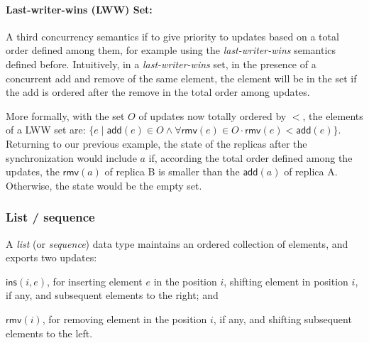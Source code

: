 \documentclass[12pt]{article}
\def\land{\mathrel{\wedge}}
\begin{document}
\paragraph{Last-writer-wins (LWW) Set:}
A third concurrency semantics if to give priority to updates based 
on a total order defined among them, for example using the \emph{last-writer-wins}
semantics defined before. 
Intuitively, in a \emph{last-writer-wins} set, in the presence of a concurrent 
add and remove of the same element, the element will be in the set if the add 
is ordered after the remove in the total order among updates.

More formally, with the set $O$ of updates now totally ordered by $<$, the elements
of a LWW set are:
$\{e \mid \mathsf{add}(e) \in O \land \forall \mathsf{rmv}(e) \in O \cdot \mathsf{rmv}(e) < \mathsf{add}(e)\}$.
Returning to our previous example, the state of the replicas after the
synchronization would include $a$ if, according the total order defined 
among the updates, the $\mathsf{rmv}(a)$ of replica B is smaller than
the $\mathsf{add}(a)$ of replica A. Otherwise, the state would be the empty set.

\subsubsection{List / sequence}
A \emph{list} (or \emph{sequence}) data type maintains an ordered collection of 
elements, and exports two updates:
\begin{inparaenum}[(i)]
\item $\mathsf{ins}(i,e)$, for inserting element $e$ in the position $i$, shifting 
element in position $i$, if any, and subsequent elements to the right; and 
\item $\mathsf{rmv}(i)$, for removing element in the position $i$, if any, and shifting
subsequent elements to the left.
\end{inparaenum}

\end{document}
